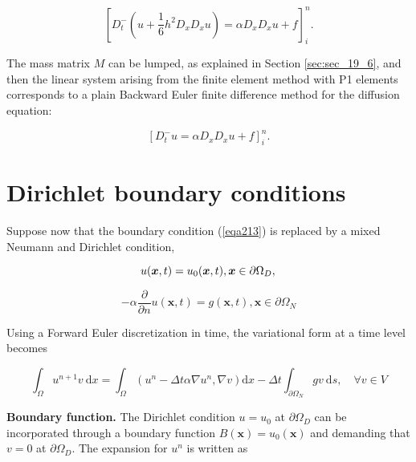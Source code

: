 \documentclass[../main.tex]{subfiles}
\begin{document}
		\begin{equation}
		\label{eqa234}
			\left[D_{t}^{-}\left(u+\frac{1}{6} h^{2} D_{x} D_{x} u\right)=\alpha D_{x} D_{x} u+f\right]_{i}^{n} .
		\end{equation}
	
		The mass matrix $M$ can be lumped, as explained in Section \ref{sec:sec_19_6}, and then the linear system arising from the finite element method with P1 elements corresponds to a plain Backward Euler finite difference method for the diffusion equation:

		\begin{equation}	
		\label{eqa235}
			\left[D_{t}^{-} u=\alpha D_{x} D_{x} u+f\right]_{i}^{n} .
		\end{equation}
	
\section[Dirichlet boundary conditions]{Dirichlet boundary conditions}
	\label{sec:sec_19_8}
		\noindent Suppose now that the boundary condition (\ref{eqa213}) is replaced by a mixed Neumann and Dirichlet condition,
		
		\begin{equation}
		\label{236}
			u(\boldsymbol{x}, t)=u_{0}(\boldsymbol{x}, t),\boldsymbol{x} \in \partial \Omega_{D}, \\
		\end{equation}
	
		\begin{equation}
		\label{237}
			-\alpha \frac{\partial}{\partial n} u(\boldsymbol{x}, t)=g(\boldsymbol{x}, t), \boldsymbol{x} \in \partial \Omega_{N}
		\end{equation}
	
		\noindent Using a Forward Euler discretization in time, the variational form at a time level becomes
		
		\begin{equation}
		\label{eqa238}
			\int_{\Omega} u^{n+1} v \mathrm{~d} x=\int_{\Omega}\left(u^{n}-\Delta t \alpha \nabla u^{n}, \nabla v\right) \mathrm{d} x-\Delta t \int_{\partial \Omega_{N}} g v \mathrm{~d} s, \quad \forall v \in V
		\end{equation}
	
		\noindent \textbf{Boundary function.   } The Dirichlet condition $u=u_{0}$ at $\partial \Omega_{D}$ can be incorporated through a boundary function $B(\boldsymbol{x})=u_{0}(\boldsymbol{x})$ and demanding that $v=0$ at $\partial \Omega_{D}$. The expansion for $u^{n}$ is written as
		
\end{document}
